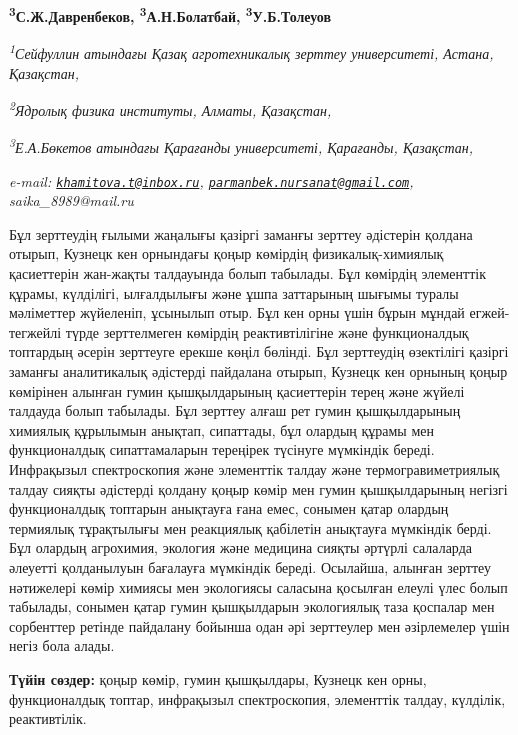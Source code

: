{\bfseries \textsuperscript{3}С.Ж.Давренбеков,
\textsuperscript{3}А.Н.Болатбай, \textsuperscript{3}У.Б.Толеуов}

\emph{\textsuperscript{1}Сейфуллин атындағы Қазақ агротехникалық зерттеу
университеті, Астана, Қазақстан,}

\emph{\textsuperscript{2}Ядролық физика институты, Алматы, Қазақстан,}

\emph{\textsuperscript{3}Е.А.Бөкетов атындағы Қарағанды
\hspace{0pt}\hspace{0pt}университеті, Қарағанды, Қазақстан,}

\emph{e-mail:
\href{mailto:khamitova.t@inbox.ru}{\nolinkurl{khamitova.t@inbox.ru}},
\href{mailto:parmanbek.nursanat@gmail.com}{\nolinkurl{parmanbek.nursanat@gmail.com}},
saika\_8989@mail.ru}

Бұл зерттеудің ғылыми жаңалығы қазіргі заманғы зерттеу әдістерін қолдана
отырып, Кузнецк кен орнындағы қоңыр көмірдің физикалық-химиялық
қасиеттерін жан-жақты талдауында болып табылады. Бұл көмірдің элементтік
құрамы, күлділігі, ылғалдылығы және ұшпа заттарының шығымы туралы
мәліметтер жүйеленіп, ұсынылып отыр. Бұл кен орны үшін бұрын мұндай
егжей-тегжейлі түрде зерттелмеген көмірдің реактивтілігіне және
функционалдық топтардың әсерін зерттеуге ерекше көңіл бөлінді. Бұл
зерттеудің өзектілігі қазіргі заманғы аналитикалық әдістерді пайдалана
отырып, Кузнецк кен орнының қоңыр көмірінен алынған гумин қышқылдарының
қасиеттерін терең және жүйелі талдауда болып табылады. Бұл зерттеу алғаш
рет гумин қышқылдарының химиялық құрылымын анықтап, сипаттады, бұл
олардың құрамы мен функционалдық сипаттамаларын тереңірек түсінуге
мүмкіндік береді. Инфрақызыл спектроскопия және элементтік талдау және
термогравиметриялық талдау сияқты әдістерді қолдану қоңыр көмір мен
гумин қышқылдарының негізгі функционалдық топтарын анықтауға ғана емес,
сонымен қатар олардың термиялық тұрақтылығы мен реакциялық қабілетін
анықтауға мүмкіндік берді. Бұл олардың агрохимия, экология және медицина
сияқты әртүрлі салаларда әлеуетті қолданылуын бағалауға мүмкіндік
береді. Осылайша, алынған зерттеу нәтижелері көмір химиясы мен
экологиясы саласына қосылған елеулі үлес болып табылады, сонымен қатар
гумин қышқылдарын экологиялық таза қоспалар мен сорбенттер ретінде
пайдалану бойынша одан әрі зерттеулер мен әзірлемелер үшін негіз бола
алады.

{\bfseries Түйін сөздер:} қоңыр көмір, гумин қышқылдары, Кузнецк кен орны,
функционалдық топтар, инфрақызыл спектроскопия, элементтік талдау,
күлділік, реактивтілік.

